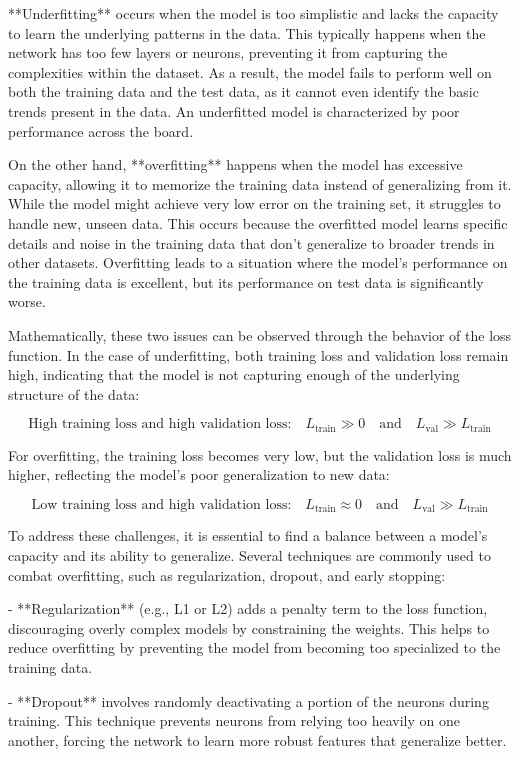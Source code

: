 **Underfitting** occurs when the model is too simplistic and lacks the capacity to learn the underlying patterns in the data. This typically happens when the network has too few layers or neurons, preventing it from capturing the complexities within the dataset. As a result, the model fails to perform well on both the training data and the test data, as it cannot even identify the basic trends present in the data. An underfitted model is characterized by poor performance across the board.

On the other hand, **overfitting** happens when the model has excessive capacity, allowing it to memorize the training data instead of generalizing from it. While the model might achieve very low error on the training set, it struggles to handle new, unseen data. This occurs because the overfitted model learns specific details and noise in the training data that don't generalize to broader trends in other datasets. Overfitting leads to a situation where the model's performance on the training data is excellent, but its performance on test data is significantly worse.

Mathematically, these two issues can be observed through the behavior of the loss function. In the case of underfitting, both training loss and validation loss remain high, indicating that the model is not capturing enough of the underlying structure of the data:

\[
\text{High training loss and high validation loss:} \quad L_{\text{train}} \gg 0 \quad \text{and} \quad L_{\text{val}} \gg L_{\text{train}}
\]

For overfitting, the training loss becomes very low, but the validation loss is much higher, reflecting the model's poor generalization to new data:

\[
\text{Low training loss and high validation loss:} \quad L_{\text{train}} \approx 0 \quad \text{and} \quad L_{\text{val}} \gg L_{\text{train}}
\]

To address these challenges, it is essential to find a balance between a model's capacity and its ability to generalize. Several techniques are commonly used to combat overfitting, such as regularization, dropout, and early stopping:

- **Regularization** (e.g., L1 or L2) adds a penalty term to the loss function, discouraging overly complex models by constraining the weights. This helps to reduce overfitting by preventing the model from becoming too specialized to the training data.
  
- **Dropout** involves randomly deactivating a portion of the neurons during training. This technique prevents neurons from relying too heavily on one another, forcing the network to learn more robust features that generalize better.
  

